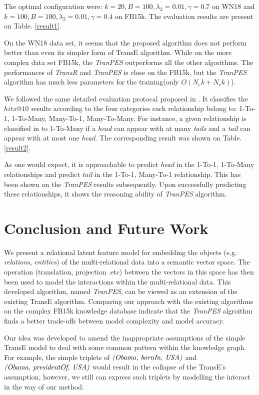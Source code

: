 \documentclass[10pt,journal]{IEEEtran}
\begin{document}
The optimal configuration were: $k=20, B = 100, \lambda_2=0.01, \gamma=0.7$ on WN18 and $k=100, B=100, \lambda_2 = 0.01, \gamma=0.4$ on FB15k. The evaluation results are present on Table. \ref{result1}.

On the WN18 data set, it seems that the proposed algorithm does not perform better than even its simpler form of TransE algorithm. While on the more complex data set FB15k, the \emph{TranPES} outperforms all the other algorithms.  The performances of \emph{TransR} and \emph{TranPES} is close on the FB15k, but the \emph{TranPES} algorithm has much less parameters for the training(only $O(N_ek+N_rk)$).

We followed the same detailed evaluation protocal proposed in \cite{bordes_translating_2013}. It classifies the $hits@10$ results according to the four categories each relationship belong to:  1-To-1, 1-To-Many, Many-To-1, Many-To-Many. For instance, a given relationship is classified in to 1-To-Many if a \emph{head} can appear with at many \emph{tails} and a \emph{tail} can appear with at most one \emph{head}.  The corresponding result was shown on Table. \ref{result2}. 

As one would expect, it is approachable to predict \emph{head} in the 1-To-1, 1-To-Many  relationships and predict \emph{tail} in the 1-To-1, Many-To-1 relationship. This has been shown on the \emph{TranPES} results subsequently. Upon successfully predicting these relationships, it shows the reasoning ability of \emph{TranPES} algorithm.




\section{Conclusion and Future Work} \label{conclusion}
We present a relational latent feature model for embedding the objects (e.g. \emph{relations}, \emph{entities}) of the multi-relational data into a semantic vector space.  The operation (translation, projection .etc) between the vectors in this space has then been used to model the interactions within the multi-relational data. This developed algorithm, named \emph{TranPES}, can be viewed as an extension of the existing TransE algorithm. Comparing our approach with the existing algorithms on the complex FB15k knowledge database indicate that the \emph{TranPES} algroithm finds a better trade-offs between model complexity and model accuracy.

Our idea was developed to amend the inappropriate assumptions of the simple TransE model to deal with some common pattern within the knowledge graph. For example, the simple triplets of $\emph{(Obama, bornIn, USA)}$ and $\emph{(Obama, presidentOf, USA)}$ would result in the collapse of the TransE's assumption, however, we still can express such triplets by modelling the interact in the way of our method.
\end{document}
